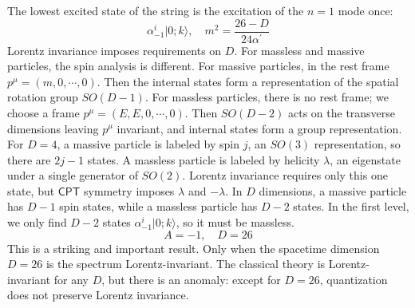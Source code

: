 The lowest excited state of the string is the excitation of the $n=1$ mode once: 
\begin{equation}
	\alpha_{-1}^{i}|0 ; k\rangle, \quad m^{2}=\frac{26-D}{24 \alpha^{\prime}}
\end{equation}
Lorentz invariance imposes requirements on $D$. For massless and massive particles, the spin analysis is different. For massive particles, in the rest frame $p^\mu=(m, 0, \cdots, 0)$. 
Then the internal states form a representation of the spatial rotation group $SO(D-1)$. For massless particles, there is no rest frame; we choose a frame $p^\mu=(E, E, 0, \cdots, 0)$. Then $SO(D-2)$ acts on the transverse dimensions leaving $p^\mu$ invariant, and internal states form a group representation. For $D=4$, a massive particle is labeled by spin $j$, an $SO(3)$ representation, so there are $2j-1$ states. A massless particle is labeled by helicity $\lambda$, an eigenstate under a single generator of $SO(2)$. Lorentz invariance requires only this one state, but $\mathsf{CPT}$ symmetry imposes $\lambda$ and $-\lambda$. 
In $D$ dimensions, a massive particle has $D-1$ spin states, while a massless particle has $D-2$ states. In the first level, we only find $D-2$ states $\alpha_{-1}^{i}|0 ;  k\rangle$, so it must be massless. 
\begin{equation}
	A=-1,\quad D=26
\end{equation}
This is a striking and important result. Only when the spacetime dimension $D=26$ is the spectrum Lorentz-invariant. The classical theory is Lorentz-invariant for any $D$, but there is an anomaly: except for $D=26$, quantization does not preserve Lorentz invariance. 


